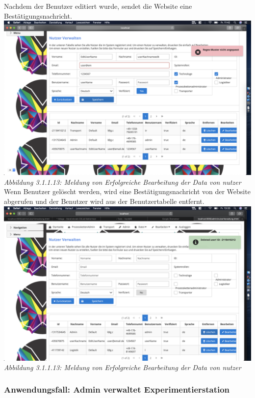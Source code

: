 \documentclass[enabledeprecatedfontcommands,fontsize=12pt,paper=a4,twoside]{scrartcl}
\begin{document}
Nachdem der Benutzer editiert wurde, sendet die Website eine Bestätigungsnachricht.
\hypertarget{sc3.1.2.6}{
\includegraphics[width=1\textwidth]{Screenshots/InconsistenceDataUserBearbeitung.png}
\textit{Abbildung 3.1.1.13: Meldung von Erfolgreiche Bearbeitung der Data von nutzer}
} \\
Wenn Benutzer gelöscht werden, wird eine Bestätigungsnachricht von der Website abgerufen und der Benutzer wird aus der Benutzertabelle entfernt.
\hypertarget{sc3.1.2.7}{
\includegraphics[width=1\textwidth]{Screenshots/BenutzerEntfernen.png}
\textit{Abbildung 3.1.1.13: Meldung von Erfolgreiche Bearbeitung der Data von nutzer}
} \\

\subsubsection{Anwendungsfall: Admin verwaltet Experimentierstation}
\end{document}
